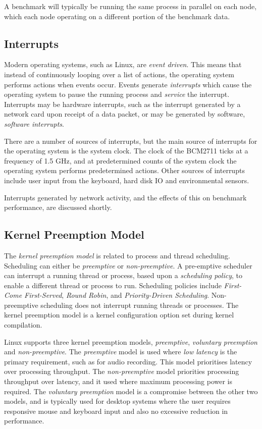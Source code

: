 A benchmark will typically be running the same process in parallel on each node, which each node operating on a different portion of the benchmark data.


\subsection{Interrupts}

Modern operating systems, such as Linux, are \emph{event driven}. This means that instead of continuously looping over a list of actions, the operating system performs actions when events occur. Events generate \emph{interrupts} which cause the operating system to pause the running process and \emph{service} the interrupt. Interrupts may be hardware interrupts, such as the interrupt generated by a network card upon receipt of a data packet, or may be generated by software, \emph{software interrupts}.

There are a number of sources of interrupts, but the main source of interrupts for the operating system is the system clock. The clock of the BCM2711 ticks at a frequency of 1.5 GHz, and at predetermined counts of the system clock the operating system performs predetermined actions. Other sources of interrupts include user input from the keyboard, hard disk IO and environmental sensors.

Interrupts generated by network activity, and the effects of this on benchmark performance, are discussed shortly.


\subsection{Kernel Preemption Model}

The \emph{kernel preemption model} is related to process and thread scheduling. Scheduling can either be \emph{preemptive} or \emph{non-preemptive}. A pre-emptive scheduler can interrupt a running thread or process, based upon a \emph{scheduling policy}, to enable a different thread or process to run. Scheduling policies include \emph{First-Come First-Served}, \emph{Round Robin}, and \emph{Priority-Driven Scheduling}. Non-preemptive scheduling does not interrupt running threads or processes. The kernel preemption model is a kernel configuration option set during kernel compilation.

Linux supports three kernel preemption models, \emph{preemptive}, \emph{voluntary preemption} and \emph{non-preemptive}. The \emph{preemptive} model is used where \emph{low latency} is the primary requirement, such as for audio recording. This model prioritises latency over processing throughput. The \emph{non-preemptive} model priorities processing throughput over latency, and it used where maximum processing power is required. The \emph{voluntary preemption} model is a compromise between the other two models, and is typically used for desktop systems where the user requires responsive mouse and keyboard input and also no excessive reduction in performance.

